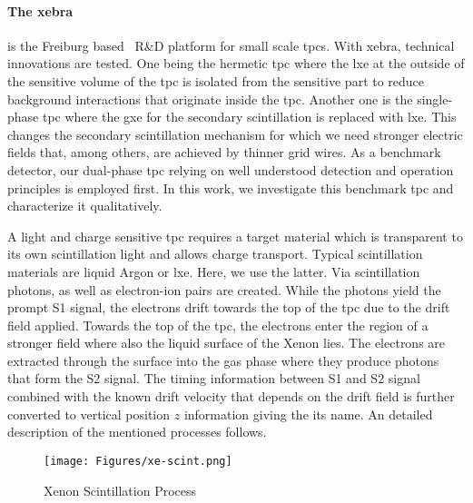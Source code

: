 \paragraph{The \gls{xebra}} is the Freiburg based \darwin~R\&D platform for small scale \glspl{tpc}.  %
With \gls{xebra}, technical innovations are tested.
One being the hermetic \gls{tpc} where the \gls{lxe} at the outside of the sensitive volume of the \gls{tpc} is isolated from the sensitive part to reduce background interactions that originate inside the \gls{tpc}.
Another one is the single-phase \gls{tpc} where the \gls{gxe} for the secondary scintillation is replaced with \gls{lxe}.
This changes the secondary scintillation mechanism for which we need stronger electric fields that, among others, are achieved by thinner grid wires.
As a benchmark detector, our dual-phase \gls{tpc} relying on well understood detection and operation principles is employed first.
In this work, we investigate this benchmark \gls{tpc} and characterize it qualitatively.

A light and charge sensitive \gls{tpc} requires a target material which is transparent to its own scintillation light and allows charge transport.
Typical scintillation materials are liquid Argon or \gls{lxe}.
Here, we use the latter.
Via scintillation photons, as well as electron-ion pairs are created.
While the photons yield the prompt S1 signal, the electrons drift towards the top of the \gls{tpc} due to the drift field applied.
Towards the top of the \gls{tpc}, the electrons enter the region of a stronger field where also the liquid surface of the Xenon lies.
The electrons are extracted through the surface into the gas phase where they produce photons that form the S2 signal.
The timing information between S1 and S2 signal combined with the known drift velocity that depends on the drift field is further converted to vertical position $ z $ information giving the \emph{} its name.
An detailed description of the mentioned processes follows.

\begin{figure}
\centering
\texttt{[image: Figures/xe-scint.png]}  %
\caption[Xenon Scintillation Process]{
    Xenon Scintillation Process~\cite{ABism}
    }
\label{fig:xe-scint-process}
\end{figure}


